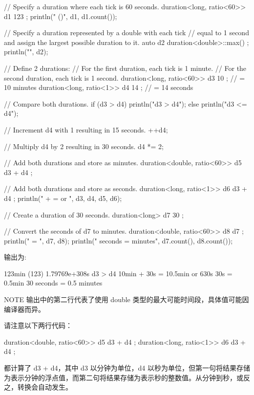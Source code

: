 \begin{cpp}
// Specify a duration where each tick is 60 seconds.
duration<long, ratio<60>> d1 { 123 };
println("{} ({})", d1, d1.count());

// Specify a duration represented by a double with each tick
// equal to 1 second and assign the largest possible duration to it.
auto d2 { duration<double>::max() };
println("{}", d2);

// Define 2 durations:
// For the first duration, each tick is 1 minute.
// For the second duration, each tick is 1 second.
duration<long, ratio<60>> d3 { 10 }; // = 10 minutes
duration<long, ratio<1>> d4 { 14 }; // = 14 seconds

// Compare both durations.
if (d3 > d4) { println("d3 > d4"); }
else { println("d3 <= d4"); }

// Increment d4 with 1 resulting in 15 seconds.
++d4;

// Multiply d4 by 2 resulting in 30 seconds.
d4 *= 2;

// Add both durations and store as minutes.
duration<double, ratio<60>> d5 { d3 + d4 };

// Add both durations and store as seconds.
duration<long, ratio<1>> d6 { d3 + d4 };
println("{} + {} = {} or {}", d3, d4, d5, d6);

// Create a duration of 30 seconds.
duration<long> d7 { 30 };

// Convert the seconds of d7 to minutes.
duration<double, ratio<60>> d8 { d7 };
println("{} = {}", d7, d8);
println("{} seconds = {} minutes", d7.count(), d8.count());
\end{cpp}

输出为:

\begin{shell}
123min (123)
1.79769e+308s
d3 > d4
10min + 30s = 10.5min or 630s
30s = 0.5min
30 seconds = 0.5 minutes
\end{shell}

\begin{myNotic}{NOTE}
输出中的第二行代表了使用 double 类型的最大可能时间段，具体值可能因编译器而异。
\end{myNotic}

请注意以下两行代码：

\begin{cpp}
duration<double, ratio<60>> d5 { d3 + d4 };
duration<long, ratio<1>> d6 { d3 + d4 };
\end{cpp}

都计算了 d3 + d4，其中 d3 以分钟为单位，d4 以秒为单位，但第一句将结果存储为表示分钟的浮点值，而第二句将结果存储为表示秒的整数值。从分钟到秒，或反之，转换会自动发生。

